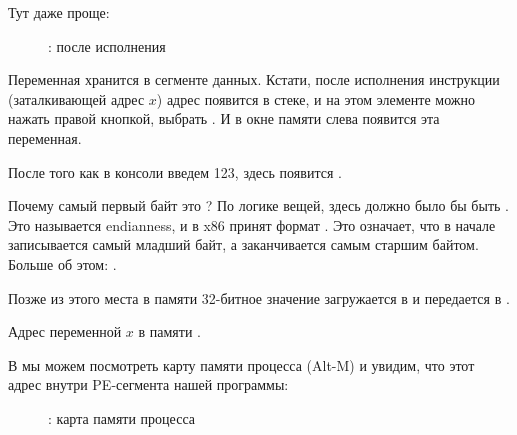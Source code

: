 \clearpage
{}
\myindex{\olly}

Тут даже проще:

\begin{figure}[H]
\centering
{}
\caption{\olly: после исполнения \scanf}
\label{fig:scanf_ex2_olly_1}
\end{figure}

Переменная хранится в сегменте данных.
Кстати, после исполнения инструкции \PUSH (заталкивающей адрес $x$) адрес появится в стеке, 
и на этом элементе можно нажать правой кнопкой, выбрать .
И в окне памяти слева появится эта переменная.

После того как в консоли введем 123, здесь появится .

Почему самый первый байт это ?
По логике вещей, здесь должно было бы быть .
Это называется \gls{endianness}, и в x86 принят формат .
Это означает, что в начале записывается самый младший байт, а заканчивается самым старшим байтом.
Больше об этом: .

Позже из этого места в памяти 32-битное значение загружается в \EAX и передается в \printf.

Адрес переменной $x$ в памяти .

\clearpage
В \olly{} мы можем посмотреть карту памяти процесса (Alt-M) и увидим, что этот адрес
внутри PE-сегмента  нашей программы:

\begin{figure}[H]
\centering
{}
\caption{\olly: карта памяти процесса}
\label{fig:scanf_ex2_olly_2}
\end{figure}
